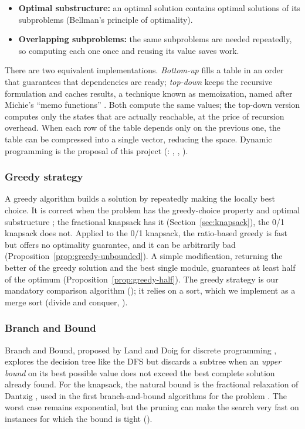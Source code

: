 \begin{itemize}[leftmargin=1.4em,itemsep=1pt]
\item \textbf{Optimal substructure:} an optimal solution contains optimal solutions of its subproblems (Bellman's principle of optimality).
\item \textbf{Overlapping subproblems:} the same subproblems are needed repeatedly, so computing each one once and reusing its value saves work.
\end{itemize}

There are two equivalent implementations. \emph{Bottom-up} fills a table in an order that guarantees that dependencies are ready; \emph{top-down} keeps the recursive formulation and caches results, a technique known as memoization, named after Michie's ``memo functions'' \cite{michie1968}. Both compute the same values; the top-down version computes only the states that are actually reachable, at the price of recursion overhead. When each row of the table depends only on the previous one, the table can be compressed into a single vector, reducing the space. Dynamic programming is the proposal of this project (: , , ).

\subsubsection{Greedy strategy}

A greedy algorithm builds a solution by repeatedly making the locally best choice. It is correct when the problem has the greedy-choice property and optimal substructure \cite{cormen2022}; the fractional knapsack has it (Section~\ref{sec:knapsack}), the 0/1 knapsack does not. Applied to the 0/1 knapsack, the ratio-based greedy is fast but offers no optimality guarantee, and it can be arbitrarily bad (Proposition~\ref{prop:greedy-unbounded}). A simple modification, returning the better of the greedy solution and the best single module, guarantees at least half of the optimum \cite{kellerer2004} (Proposition~\ref{prop:greedy-half}). The greedy strategy is our mandatory comparison algorithm (); it relies on a sort, which we implement as a merge sort (divide and conquer, ).

\subsubsection{Branch and Bound}

Branch and Bound, proposed by Land and Doig for discrete programming \cite{land1960}, explores the decision tree like the DFS but discards a subtree when an \emph{upper bound} on its best possible value does not exceed the best complete solution already found. For the knapsack, the natural bound is the fractional relaxation of Dantzig \cite{dantzig1957}, used in the first branch-and-bound algorithms for the problem \cite{kolesar1967,horowitz1974}. The worst case remains exponential, but the pruning can make the search very fast on instances for which the bound is tight ().

